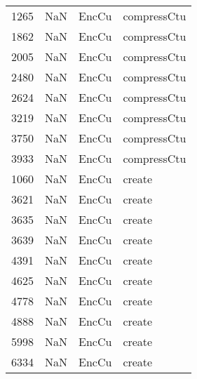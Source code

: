 \begin{tabular}{llll}
1265 &                   NaN &                      EncCu &                               compressCtu \\
1862 &                   NaN &                      EncCu &                               compressCtu \\
2005 &                   NaN &                      EncCu &                               compressCtu \\
2480 &                   NaN &                      EncCu &                               compressCtu \\
2624 &                   NaN &                      EncCu &                               compressCtu \\
3219 &                   NaN &                      EncCu &                               compressCtu \\
3750 &                   NaN &                      EncCu &                               compressCtu \\
3933 &                   NaN &                      EncCu &                               compressCtu \\
1060 &                   NaN &                      EncCu &                                    create \\
3621 &                   NaN &                      EncCu &                                    create \\
3635 &                   NaN &                      EncCu &                                    create \\
3639 &                   NaN &                      EncCu &                                    create \\
4391 &                   NaN &                      EncCu &                                    create \\
4625 &                   NaN &                      EncCu &                                    create \\
4778 &                   NaN &                      EncCu &                                    create \\
4888 &                   NaN &                      EncCu &                                    create \\
5998 &                   NaN &                      EncCu &                                    create \\
6334 &                   NaN &                      EncCu &                                    create \\

\end{tabular}
